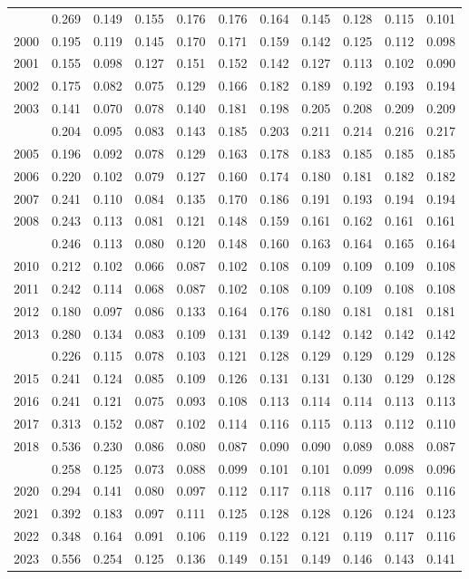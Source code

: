 \documentclass[
]{article}
\begin{document}
\begin{longtable}[t]{lrrrrrrrrrr}
\addlinespace
1999 & 0.269 & 0.149 & 0.155 & 0.176 & 0.176 & 0.164 & 0.145 & 0.128 & 0.115 & 0.101\\
2000 & 0.195 & 0.119 & 0.145 & 0.170 & 0.171 & 0.159 & 0.142 & 0.125 & 0.112 & 0.098\\
2001 & 0.155 & 0.098 & 0.127 & 0.151 & 0.152 & 0.142 & 0.127 & 0.113 & 0.102 & 0.090\\
2002 & 0.175 & 0.082 & 0.075 & 0.129 & 0.166 & 0.182 & 0.189 & 0.192 & 0.193 & 0.194\\
2003 & 0.141 & 0.070 & 0.078 & 0.140 & 0.181 & 0.198 & 0.205 & 0.208 & 0.209 & 0.209\\
\addlinespace
2004 & 0.204 & 0.095 & 0.083 & 0.143 & 0.185 & 0.203 & 0.211 & 0.214 & 0.216 & 0.217\\
2005 & 0.196 & 0.092 & 0.078 & 0.129 & 0.163 & 0.178 & 0.183 & 0.185 & 0.185 & 0.185\\
2006 & 0.220 & 0.102 & 0.079 & 0.127 & 0.160 & 0.174 & 0.180 & 0.181 & 0.182 & 0.182\\
2007 & 0.241 & 0.110 & 0.084 & 0.135 & 0.170 & 0.186 & 0.191 & 0.193 & 0.194 & 0.194\\
2008 & 0.243 & 0.113 & 0.081 & 0.121 & 0.148 & 0.159 & 0.161 & 0.162 & 0.161 & 0.161\\
\addlinespace
2009 & 0.246 & 0.113 & 0.080 & 0.120 & 0.148 & 0.160 & 0.163 & 0.164 & 0.165 & 0.164\\
2010 & 0.212 & 0.102 & 0.066 & 0.087 & 0.102 & 0.108 & 0.109 & 0.109 & 0.109 & 0.108\\
2011 & 0.242 & 0.114 & 0.068 & 0.087 & 0.102 & 0.108 & 0.109 & 0.109 & 0.108 & 0.108\\
2012 & 0.180 & 0.097 & 0.086 & 0.133 & 0.164 & 0.176 & 0.180 & 0.181 & 0.181 & 0.181\\
2013 & 0.280 & 0.134 & 0.083 & 0.109 & 0.131 & 0.139 & 0.142 & 0.142 & 0.142 & 0.142\\
\addlinespace
2014 & 0.226 & 0.115 & 0.078 & 0.103 & 0.121 & 0.128 & 0.129 & 0.129 & 0.129 & 0.128\\
2015 & 0.241 & 0.124 & 0.085 & 0.109 & 0.126 & 0.131 & 0.131 & 0.130 & 0.129 & 0.128\\
2016 & 0.241 & 0.121 & 0.075 & 0.093 & 0.108 & 0.113 & 0.114 & 0.114 & 0.113 & 0.113\\
2017 & 0.313 & 0.152 & 0.087 & 0.102 & 0.114 & 0.116 & 0.115 & 0.113 & 0.112 & 0.110\\
2018 & 0.536 & 0.230 & 0.086 & 0.080 & 0.087 & 0.090 & 0.090 & 0.089 & 0.088 & 0.087\\
\addlinespace
2019 & 0.258 & 0.125 & 0.073 & 0.088 & 0.099 & 0.101 & 0.101 & 0.099 & 0.098 & 0.096\\
2020 & 0.294 & 0.141 & 0.080 & 0.097 & 0.112 & 0.117 & 0.118 & 0.117 & 0.116 & 0.116\\
2021 & 0.392 & 0.183 & 0.097 & 0.111 & 0.125 & 0.128 & 0.128 & 0.126 & 0.124 & 0.123\\
2022 & 0.348 & 0.164 & 0.091 & 0.106 & 0.119 & 0.122 & 0.121 & 0.119 & 0.117 & 0.116\\
2023 & 0.556 & 0.254 & 0.125 & 0.136 & 0.149 & 0.151 & 0.149 & 0.146 & 0.143 & 0.141\\*
\end{longtable}
\end{document}
